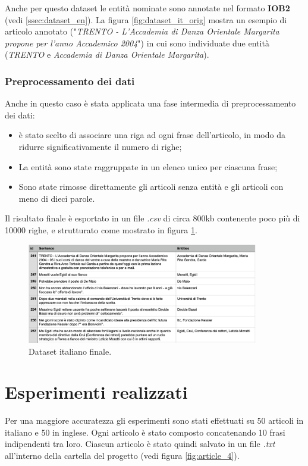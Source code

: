 \documentclass[a4paper,11pt]{article}
\begin{document}
Anche per questo dataset le entità nominate sono annotate nel formato \textbf{IOB2} (vedi \ref{ssec:dataset_en}). La figura \ref{fig:dataset_it_orig} mostra un esempio di articolo annotato ("\textit{TRENTO - L'Accademia di Danza Orientale Margarita propone per l'anno Accademico 2004}") in cui sono individuate due entità (\textit{TRENTO} e \textit{Accademia di Danza Orientale Margarita}).

\subsubsection{Preprocessamento dei dati}
Anche in questo caso è stata applicata una fase intermedia di preprocessamento dei dati:

\begin{itemize}
	\item è stato scelto di associare una riga ad ogni frase dell'articolo, in modo da ridurre significativamente il numero di righe;
	\item La entità sono state raggruppate in un elenco unico per ciascuna frase;
	\item Sono state rimosse direttamente gli articoli senza entità e gli articoli con meno di dieci parole.
\end{itemize}

Il risultato finale è esportato in un file \textit{.csv} di circa 800kb contenente poco più di 10000 righe, e strutturato come mostrato in figura \ref{fig:dataset_it_cleaned}.

\begin{figure}[H]
\centering
\includegraphics[width=0.9\textwidth]{img/dataset-it-cleaned}
\caption{Dataset italiano finale.}
\label{fig:dataset_it_cleaned}
\end{figure}

\section{Esperimenti realizzati}
\label{sec:experiments}
Per una maggiore accuratezza gli esperimenti sono stati effettuati su 50 articoli in italiano e 50 in inglese. Ogni articolo è stato composto concatenando 10 frasi indipendenti tra loro.
Ciascun articolo è stato quindi salvato in un file \textit{.txt} all'interno della cartella del progetto (vedi figura \ref{fig:article_4}).
\end{document}
